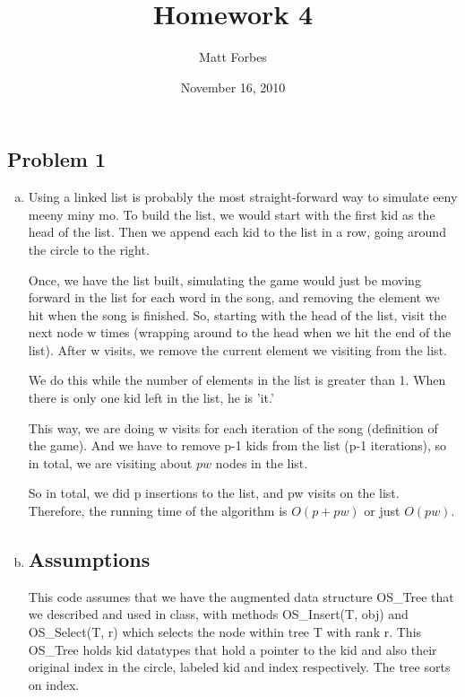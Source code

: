 \documentclass[a4paper,12pt]{article}
\begin{document}
\title{Homework 4}
\author{Matt Forbes}
\date{November 16, 2010}
\maketitle

\subsection*{Problem 1}


\begin{enumerate}[a)]
  \item 

    Using a linked list is probably the most straight-forward way to
    simulate eeny meeny miny mo. To build the list, we would start
    with the first kid as the head of the list. Then we append each
    kid to the list in a row, going around the circle to the right.

    \noindent Once, we have the list built, simulating the game would
    just be moving forward in the list for each word in the song, and
    removing the element we hit when the song is finished. So,
    starting with the head of the list, visit the next node w times
    (wrapping around to the head when we hit the end of the
    list). After w visits, we remove the current element we 
    visiting from the list.

    \noindent We do this while the number of elements in the list is
    greater than 1. When there is only one kid left in the list, he is
    'it.'

    \noindent This way, we are doing w visits for each iteration of
    the song (definition of the game). And we have to remove p-1 kids
    from the list (p-1 iterations), so in total, we are visiting
    about \(pw\) nodes in the list.
    
    \noindent So in total, we did p insertions to the list, and pw
    visits on the list. Therefore, the running time of the algorithm
    is \(O(p + pw)\) or just \(O(pw)\).


  \item
    
\subsection*{Assumptions}

    This code assumes that we have the augmented data structure
    OS\_Tree that we described and used in class, with methods
    OS\_Insert(T, obj) and OS\_Select(T, r) which selects the node
    within tree T with rank r. This OS\_Tree holds kid datatypes that
    hold a pointer to the kid and also their original index in the
    circle, labeled kid and index respectively. The tree sorts on
    index.
    

\end{enumerate}
\end{document}
